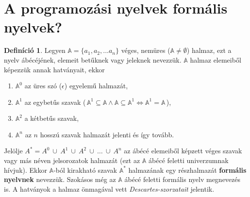 \documentclass[tocnopagenum]{thesis-ekf}
\theoremstyle{definition}
\newtheorem{definicio}[tetel]{Definíció}
\theoremstyle{remark}
\begin{document}
	\section{A programozási nyelvek formális nyelvek?}
	\begin{definicio}
		Legyen $\mathbb{A} = \{a_1, a_2, ... a_n\}$ véges, nemüres ($ \mathbb{A} \neq \emptyset$) halmaz, ezt a nyelv ábécéjének, elemeit betűknek vagy jeleknek nevezzük. $\mathbb{A}$ halmaz elemeiből képezzük annak hatványait, ekkor 
		\begin{enumerate}
			\item $\mathbb{A} ^ {0}$ az üres szó ($\epsilon$) egyelemű halmazát, 
			\item $\mathbb{A} ^ {1} $ az egybetűs szavak (\,$\mathbb{A}^{1}\subseteq\mathbb{A}\wedge\mathbb{A}\subseteq\mathbb{A}^{1} \iff \mathbb{A}^{1}=\mathbb{A}$\,), 
			\item $\mathbb{A}^{2}$ a kétbetűs szavak, 
			\item $\mathbb{A}^{n}$ az $n$ hosszú szavak halmazát jelenti és így tovább.
		\end{enumerate}
	Jelölje $A^{*}=A^{0}\ \cup\ A^{1}\ \cup\ A^{2}\ \cup\ \dots\ \cup\  A^{n}$ az ábécé elemeiből képzett véges szavak vagy más néven jelsorozatok halmazát (ezt az $\mathbb{A}$ ábécé feletti univerzumnak hívjuk). Ekkor  $\mathbb{A}$-ból kirakható szavak $\mathbb{A}^{*}$ halmazának egy részhalmazát \textbf{formális nyelvnek} nevezzük. Szokásos még az $\mathbb{A}$ ábécé feletti formális nyelv megnevezés is. A hatványok a halmaz önmagával vett \emph{Descartes-szorzatait} jelentik.
	\cite{formnyelvek}
	\end{definicio}
	
\end{document}
